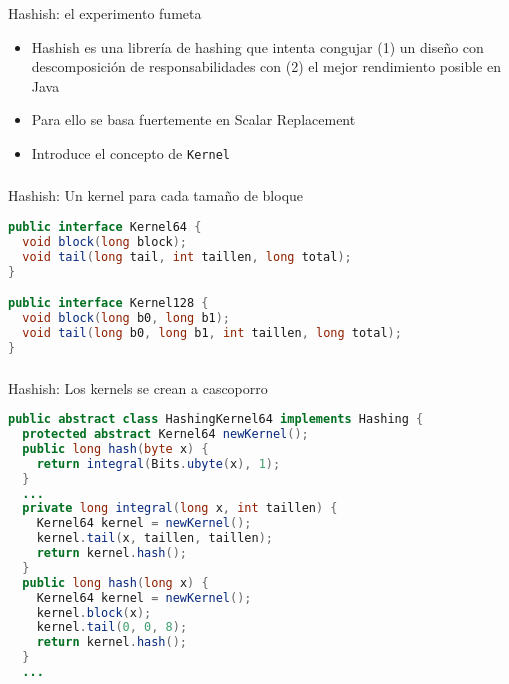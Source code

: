 \begin{frame}[fragile]
  \frametitle{\ft}
  \begin{block}{Hashish: el experimento fumeta}
    \begin{itemize}
    \item Hashish es una librería de hashing que intenta congujar
      (1) un diseño con descomposición de responsabilidades
      con (2) el mejor rendimiento posible en Java
    \item Para ello se basa fuertemente en Scalar Replacement
    \item Introduce el concepto de {\tt Kernel}
    \end{itemize}
  \end{block}
\end{frame}


\begin{frame}[fragile]
  \frametitle{\ft}
  \begin{block}{Hashish: Un kernel para cada tamaño de bloque}
    \begin{lstlisting}[language=java]
public interface Kernel64 {
  void block(long block);
  void tail(long tail, int taillen, long total);
}

public interface Kernel128 {
  void block(long b0, long b1);
  void tail(long b0, long b1, int taillen, long total);
}
    \end{lstlisting}
  \end{block}
\end{frame}


\begin{frame}[fragile]
  \frametitle{\ft}
  \begin{block}{Hashish: Los kernels se crean a cascoporro}
    \begin{lstlisting}[language=java]
public abstract class HashingKernel64 implements Hashing {
  protected abstract Kernel64 newKernel();
  public long hash(byte x) {
    return integral(Bits.ubyte(x), 1);
  }
  ...
  private long integral(long x, int taillen) {
    Kernel64 kernel = newKernel();
    kernel.tail(x, taillen, taillen);
    return kernel.hash();
  }
  public long hash(long x) {
    Kernel64 kernel = newKernel();
    kernel.block(x);
    kernel.tail(0, 0, 8);
    return kernel.hash();
  }
  ...
    \end{lstlisting}
  \end{block}
\end{frame}


